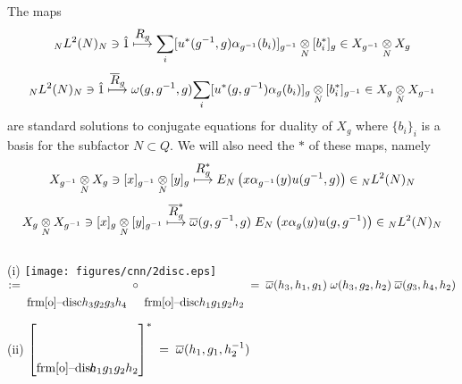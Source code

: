 \begin{rem}\label{duality}
The maps
\[
{}_N L^2(N)_N \ni \hat 1 \overset{\displaystyle R_g}{\longmapsto} \underset{i}{\sum} [u^*(g^{-1} , g) \alpha_{g^{-1}} (b_i) ]_{g^{-1}} \underset{N}{\otimes} [b^*_i]_g \in X_{g^{-1}} \underset{N}{\otimes} X_g
\]
\[
{}_N L^2(N)_N \ni \hat 1 \overset{\displaystyle \overline{R}_g}{\longmapsto} \omega (g,g^{-1},g) \underset{i}{\sum} [u^*(g, g^{-1}) \alpha_{g} (b_i) ]_{g} \underset{N}{\otimes} [b^*_i]_{g^{-1}} \in X_{g} \underset{N}{\otimes} X_{g^{-1}}
\]
are standard solutions to conjugate equations for duality of $ X_g $ where $ \{b_i\}_i $ is a basis for the subfactor $ N \subset Q $.
We will also need the $ * $ of these maps, namely
\[
X_{g^{-1}} \underset{N}{\otimes} X_g \ni [x]_{g^{-1}} \underset{N}{\otimes} [y]_g \overset{\displaystyle R^*_g}{\longmapsto} E_N \left(x \alpha_{g^{-1}} (y) u(g^{-1} , g )\right) \in {}_N L^2(N)_N
\]
\[
 X_{g} \underset{N}{\otimes} X_{g^{-1}} \ni [x]_g \underset{N}{\otimes} [y]_{g^{-1}} \overset{\displaystyle {\overline{R}}^*_g}{\longmapsto} \overline{\omega} (g, g^{-1}, g) \; E_N \left(x \alpha_{g} (y) u(g , g^{-1} )\right) \in {}_N L^2(N)_N
\]
\end{rem}
\begin{prop}\label{smbox*alg}$ { } $

(i) \hspace{1em} \raisebox{-2.7 em}
{
\texttt{[image: figures/cnn/2disc.eps]}} \; $ := \; \raisebox{-1.5 em}{\1disc{$h_3 $}{$ g_2 $}{$ g_3 $}{$ h_4 $}} \; \circ \; \raisebox{-1.5 em}{\1disc{$h_1 $}{$ g_1 $}{$ g_2 $}{$ h_2 $}} \; = \; \ol \omega (h_3, h_1, g_1) \; \omega (h_3, g_2, h_2) \; \ol \omega (g_3 , h_4 , h_2)$ \;\;\;  

(ii) $  \left[ \raisebox{-1.5 em}{\1disc{$\!\!\! h_1 $}{$ g_1 $}{$ g_2 $}{$ h_2 $}} \right]^* \; = \; \ol \omega (h_1, g_1, h^{-1}_2)  $
\; 
\end{prop}
